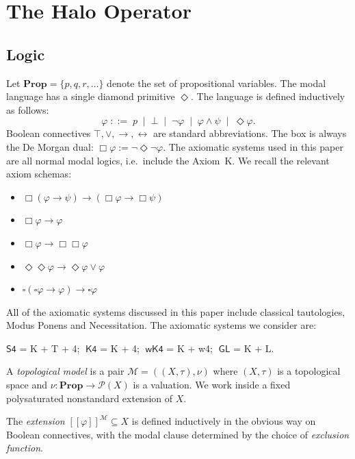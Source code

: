 \documentclass[submission,copyright,creativecommons]{eptcs}
\newcommand{\sem}[1]{[\![#1]\!]}
\newcommand{\diam}{\Diamond}
\newcommand{\sq}{\Box}
\begin{document}
\section{The Halo Operator}
\label{sec:param}


\subsection{Logic}

Let $\mathbf{Prop} = \{p, q, r, \ldots\}$ denote the set of
propositional variables. 
The modal language has a single diamond primitive
$\diam$.
The language is defined inductively as follows:
\[
  \varphi \;::=\; p \;\mid\; \bot \;\mid\; \neg\varphi \;\mid\;
    \varphi \wedge \psi \;\mid\; \diam\varphi.
\]
Boolean connectives $\top, \vee, \to, \leftrightarrow$ are standard abbreviations. The box is always the De Morgan dual:
$\sq\varphi := \neg\diam\neg\varphi$.
The axiomatic systems used in this paper are all normal modal logics, i.e.\ include the Axiom~K. 
We recall the relevant axiom schemas:
    \begin{itemize}
  \item[(K)] $\sq(\varphi \to \psi) \to (\sq\varphi \to \sq\psi)$
  \item[(T)] $\sq\varphi \to \varphi$ 
  \item[(4)] $\sq\varphi \to \sq\sq\varphi$ 
  \item[(w4)] $\diam\diam\varphi \to \diam\varphi \vee \varphi$
  \item[(L)] $\square(\square\varphi\to\varphi)\to \square \varphi$
\end{itemize}
All of the axiomatic systems discussed in this paper include classical tautologies, Modus Ponens and Necessitation.  
The axiomatic systems we consider are:
\begin{center}
    $\mathsf{S4}$ = K + T + 4; $\;\mathsf{K4}$ = K + 4; $\;\mathsf{wK4}$ = K + w4; $\;\mathsf{GL}$ = K + L.
\end{center} 
\begin{definition}
\label{def:model}
A \emph{topological model} is a pair $\mathcal{M} = ((X,\tau), \nu)$ where $(X,\tau)$ is a topological space and $\nu : \mathbf{Prop} \to \mathcal{P}(X)$ is a valuation. 
We work inside a fixed polysaturated nonstandard extension
of $X$.

The \emph{extension} $\sem{\varphi}^{\mathcal{M}} \subseteq X$ is defined inductively in the obvious way on Boolean connectives, with the modal clause determined by the choice of \emph{exclusion function}.
\end{definition}
\end{document}
